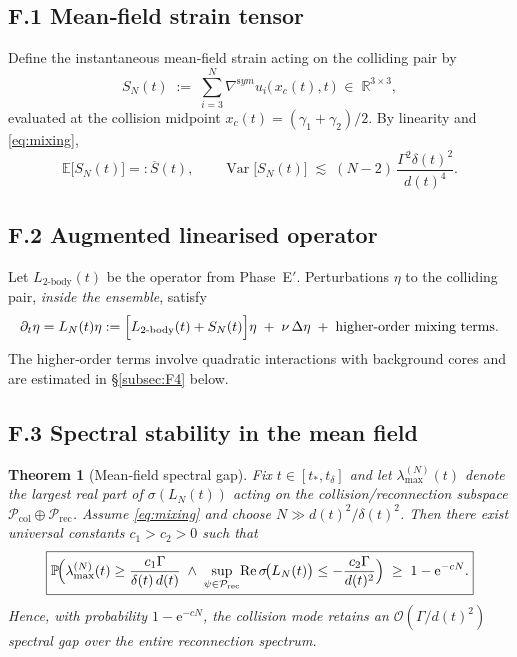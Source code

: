 \documentclass[11pt]{article}
\newtheorem{theorem}{Theorem}[section]
\theoremstyle{definition}
\theoremstyle{remark}
\newcommand{\nuvisc}{\nu}
\newcommand{\boxedEq}[1]{\begin{equation}\boxed{#1}\end{equation}}
\begin{document}
\subsection{F.1  Mean‑field strain tensor}

Define the instantaneous mean‑field strain acting on the colliding pair by
\[
S_{N}(t)\;:=\;\sum_{i=3}^{N}\nabla^{\mathrm sym}\!u_i\bigl(\,x_c(t),t\,\bigr)\;\in\;\mathbb R^{3\times3},
\]
evaluated at the collision midpoint $x_c(t)=(\gamma_1+\gamma_2)/2$.
By linearity and \eqref{eq:mixing},
\begin{equation}\label{eq:strain-moments}
\mathbb E\!\bigl[S_{N}(t)\bigr]=: \overline S(t),
\qquad
\operatorname{Var}\!\bigl[S_{N}(t)\bigr]\;\lesssim\;(N-2)\,\frac{\Gamma^{2}\delta(t)^{2}}{d(t)^{4}}.
\end{equation}

\subsection{F.2  Augmented linearised operator}

Let $L_{2\text{-body}}(t)$ be the operator from Phase E$'$.
Perturbations $\eta$ to the colliding pair, \emph{inside the ensemble}, satisfy
\begin{equation}\label{eq:LN}
\partial_t\eta
=
L_N(t)\eta
:=
\Bigl[L_{2\text{-body}}(t)+S_{N}(t)\Bigr]\eta
\;+\;\nuvisc\,\Delta\eta
\;+\;\text{higher‑order mixing terms}.
\end{equation}
The higher‑order terms involve quadratic interactions with background cores and
are estimated in \S\ref{subsec:F4} below.

\subsection{F.3  Spectral stability in the mean field}

\begin{theorem}[Mean‑field spectral gap]\label{thm:meanfield-gap}
Fix $t\in[t_*,t_\delta]$ and let $\lambda_{\max}^{(N)}(t)$ denote the largest real part of
$\sigma(L_N(t))$ acting on the collision/reconnection subspace
${\mathcal P}_{\mathrm{col}}\oplus{\mathcal P}_{\mathrm{rec}}$.
Assume \eqref{eq:mixing} and choose $N\gg d(t)^{2}/\delta(t)^{2}$.
Then there exist universal constants $c_1>c_2>0$ such that
\boxedEq{\mathbb P\!\Bigl(
\lambda_{\max}^{(N)}(t)\ge\frac{c_1\Gamma}{\delta(t)\,d(t)}
\;\wedge\;
\sup_{\psi\in\mathcal P_{\mathrm{rec}}}\!\operatorname{Re}\sigma\!\bigl(L_N(t)\bigr)\le -\frac{c_2\Gamma}{d(t)^{2}}
\Bigr)\;\ge\;1-\mathrm e^{-cN}.}
Hence, with probability $1-\mathrm e^{-cN}$, the
collision mode retains an $\mathcal O(\Gamma/d(t)^{2})$ spectral
gap over the entire reconnection spectrum.
\end{theorem}
\end{document}
